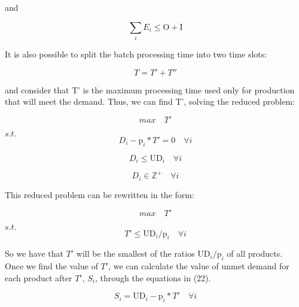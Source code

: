 \documentclass[preprint,12pt,authoryear]{elsarticle}
\begin{document}
and

\begin{equation}
\sum_i {E_i} \leq \textrm{O} + \textrm{I}
\end{equation}


It is also possible to split the batch processing time into two time slots:

\begin{equation}
T = T' + T''
\end{equation}

and consider that T' is the maximum processing time used only for production that will meet the demand. Thus, we can find T', solving the reduced problem:


\begin{equation}
max \quad T'
\end{equation}

$s.t.$ \\

\begin{equation}
D_i - \textrm{p}_i * T'  = 0 \quad \forall i
\end{equation}

\begin{equation}
D_i \leq \textrm{UD}_i \quad \forall i
\end{equation}

\begin{equation}
D_i \in  \mathbb{Z}^+ \quad \forall i
\end{equation}

This reduced problem can be rewritten in the form:

\begin{equation}
max \quad T'
\end{equation}

$s.t.$ \\

\begin{equation}
T'  \leq \textrm{UD}_i / \textrm{p}_i \quad \forall i
\end{equation}

So we have that $T'$ will be the smallest of the ratios $\textrm{UD}_i / \textrm{p}_i$ of all products. \\

Once we find the value of $T'$, we can calculate the value of unmet demand for each product after $T'$, $S_i$, through the equations in (22).

\begin{equation}
S_i = \textrm{UD}_i - \textrm{p}_i * T' \quad \forall i
\end{equation}
\end{document}
